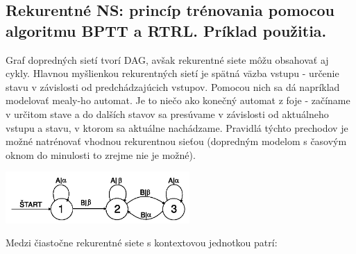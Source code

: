 \documentclass{article}
\numberwithin{equation}{section} %
\begin{document}
\subsection{Rekurentné NS: princíp trénovania pomocou algoritmu BPTT a RTRL. Príklad použitia.}
Graf dopredných sietí tvorí DAG, avšak rekurentné siete môžu obsahovať aj cykly. Hlavnou myšlienkou rekurentných sietí je spätná väzba vstupu - určenie stavu v závislosti od predchádzajúcich vstupov. Pomocou nich sa dá napríklad modelovať mealy-ho automat. Je to niečo ako konečný automat z foje - začíname v určitom stave a do dalších stavov sa presúvame v závislosti od aktuálneho vstupu a stavu, v ktorom sa aktuálne nachádzame. Pravidlá týchto prechodov je možné natrénovať vhodnou rekurentnou sieťou (dopredným modelom s časovým oknom do minulosti to zrejme nie je možné).
\begin{center}
\includegraphics[width=7cm]{imgs/mealy}\\
\end{center}
Medzi čiastočne rekurentné siete s kontextovou jednotkou patrí:
\end{document}
